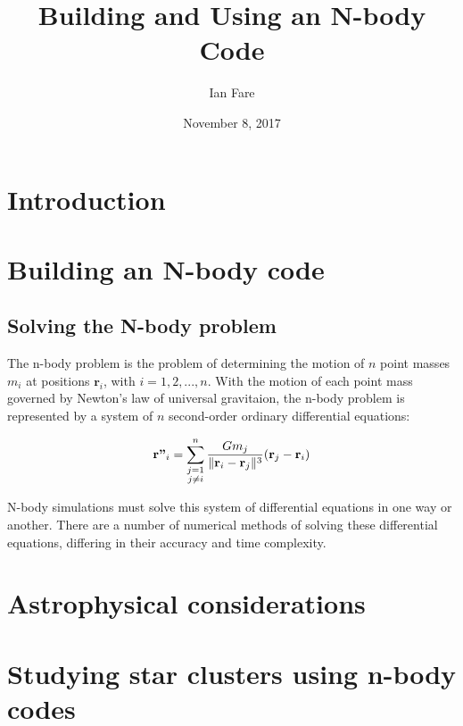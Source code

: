 \documentclass{article}
\title{Building and Using an N-body Code}
\author{Ian Fare}
\date{November 8, 2017}
\DeclarePairedDelimiter{\norm}{\lVert}{\rVert}
\begin{document}
\maketitle

\section{Introduction}

\section{Building an N-body code}

\subsection{Solving the N-body problem}

The n-body problem is the problem of determining the motion of $n$ point masses $m_i$ at positions $\textbf{r}_i$, with $i=1,2,...,n$. With the motion of each point mass governed by Newton's law of universal gravitaion, the n-body problem is represented by a system of $n$ second-order ordinary differential equations:

\begin{equation}
    \textbf{r''}_i = \sum_{\substack{j=1\\j\neq i}}^n \frac{Gm_j}{\norm{\textbf{r}_i-\textbf{r}_j}^3}(\textbf{r}_j-\textbf{r}_i)
\end{equation}

N-body simulations must solve this system of differential equations in one way or another. There are a number of numerical methods of solving these differential equations, differing in their accuracy and time complexity.


\section{Astrophysical considerations}

\section{Studying star clusters using n-body codes}





\end{document}
